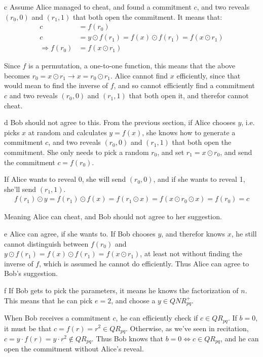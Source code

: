 \documentclass{article}
\begin{document}
\begin{paragraph}
    c Assume Alice managed to cheat, and found a commitment \(c\), and two reveals \((r_0, 0)\) and \((r_1, 1)\) that both open the commitment. It means that:
    \begin{align*}
        c &= f(r_0)\\
        c &= y \odot f(r_1) = f(x) \odot f(r_1) = f(x \odot r_1) \\
        \Rightarrow f(r_0) &= f(x \odot r_1)
    \end{align*}
    
    Since \(f\) is a permutation, a one-to-one function, this means that the above becomes \(r_0 = x \odot r_1 \rightarrow x = r_0 \odot r_1\). Alice cannot find \(x\) efficiently, since that would mean to find the inverse of \(f\), and so cannot efficiently find a commitment \(c\) and two reveals \((r_0, 0)\) and \((r_1, 1)\) that both open it, and therefor cannot cheat.
\end{paragraph}
\newpage

\begin{paragraph}
    d Bob should not agree to this. From the previous section, if Alice chooses \(y\), i.e. picks \(x\) at random and calculates \(y = f(x)\), she knows how to generate a commitment \(c\), and two reveals \((r_0, 0)\) and \((r_1, 1)\) that both open the commitment. She only needs to pick a random \(r_0\), and set \(r_1 = x \odot r_0\), and send the commitment \(c = f(r_0)\).
    
    If Alice wants to reveal 0, she will send \((r_0, 0)\), and if she wants to reveal 1, she'll send \((r_1, 1)\).
    \begin{align*}
        f(r_1) \odot y = f(r_1) \odot f(x) = f(r_1 \odot x) = f(x \odot r_0 \odot x) = f(r_0) = c
    \end{align*}
    
    Meaning Alice can cheat, and Bob should not agree to her suggestion.
\end{paragraph}

\begin{paragraph}
    e Alice can agree, if she wants to. If Bob chooses \(y\), and therefor knows \(x\), he still cannot distinguish between \(f(r_0)\) and \(y \odot f(r_1) = f(x) \odot f(r_1) = f(x \odot r_1)\), at least not without finding the inverse of \(f\), which is assumed he cannot do efficiently. Thus Alice can agree to Bob's suggestion.
\end{paragraph}

\begin{paragraph}
    f If Bob gets to pick the parameters, it means he knows the factorization of \(n\). This means that he can pick \(e = 2\), and choose a \(y \in QNR^+_{pq}\).
    
    When Bob receives a commitment \(c\), he can efficiently check if \(c \in QR_{pq}\). If \(b = 0\), it must be that \(c = f(r) = r^2 \in QR_{pq}\). Otherwise, as we've seen in recitation, \(c = y \cdot f(r) = y \cdot r^2 \not\in QR_{pq}\). Thus Bob knows that \(b = 0 \iff c \in QR_{pq}\), and he can open the commitment without Alice's reveal.
\end{paragraph}
\end{document}
